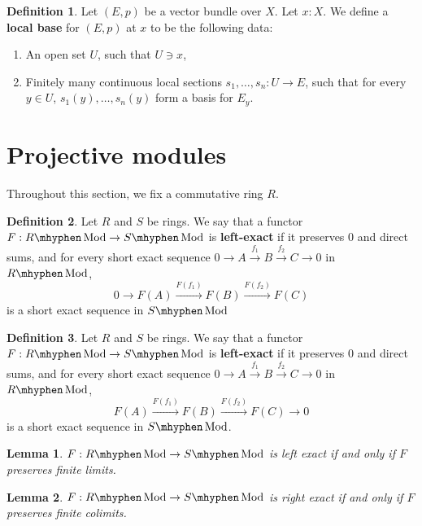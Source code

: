 \documentclass[11pt]{article}
\newcommand{\Mod}{\mhyphen\operatorname{Mod}}
\theoremstyle{plain}
\newtheorem{lemma}{Lemma}[section]
\theoremstyle{definition}
\newtheorem{definition}{Definition}[section]
\begin{document}
\begin{definition}\label{def:local-base}
  Let \((E,p)\) be a vector bundle over \(X\). Let \(x : X\). We define a \textbf{local base} for \((E,p)\) at \(x\) to be the following data:
  \begin{enumerate}[label={(\alph*)}]
  \item An open set \(U\), such that \(U \ni x\),
  \item Finitely many continuous local sections \(s_1, \dots, s_n : U \to E\), such that for every \(y \in U\), \(s_1(y), \dots, s_n(y)\) form a basis for \(E_y\).
  \end{enumerate}
\end{definition}

\section{Projective modules}
Throughout this section, we fix a commutative ring \(R\).

\begin{definition} \label{def:left-exact}
  Let \(R\) and \(S\) be rings. We say that a functor \(F : R\Mod \to S\Mod\) is \textbf{left-exact} if it preserves \(0\) and direct sums, and for every short exact sequence \(0 \to A \overset{f_1}{\to} B \overset{f_2}{\to} C \to 0\) in \(R\Mod\),
  \[0 \to F(A) \overset{F(f_1)}{\to} F(B) \overset{F(f_2)}{\to} F(C)\]
  is a short exact sequence in \(S\Mod\)
\end{definition}

\begin{definition} \label{def:right-exact}
  Let \(R\) and \(S\) be rings. We say that a functor \(F : R\Mod \to S\Mod\) is \textbf{left-exact} if it preserves \(0\) and direct sums, and for every short exact sequence \(0 \to A \overset{f_1}{\to} B \overset{f_2}{\to} C \to 0\) in \(R\Mod\),
  \[F(A) \overset{F(f_1)}{\to} F(B) \overset{F(f_2)}{\to} F(C) \to 0\]
  is a short exact sequence in \(S\Mod\).
\end{definition}

\begin{lemma}\label{lemma:left-exact-finite-limits}
  \(F : R\Mod \to S\Mod\) is left exact if and only if \(F\) preserves finite limits.
\end{lemma}

\begin{lemma}\label{lemma:right-exact-finite-limits}
  \(F : R\Mod \to S\Mod\) is right exact if and only if \(F\) preserves finite colimits.
\end{lemma}
\end{document}
